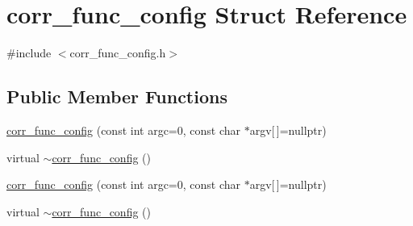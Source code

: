 \hypertarget{structcorr__func__config}{\section{corr\-\_\-func\-\_\-config Struct Reference}
\label{structcorr__func__config}
}


{\ttfamily \#include $<$corr\-\_\-func\-\_\-config.\-h$>$}

\subsection*{Public Member Functions}
\begin{DoxyCompactItemize}
\item 
\hyperlink{structcorr__func__config_a1d1717cef2daadfc19c4483323377d08}{corr\-\_\-func\-\_\-config} (const int argc=0, const char $\ast$argv\mbox{[}$\,$\mbox{]}=nullptr)
\item 
virtual \hyperlink{structcorr__func__config_a8cfc94f47cce05f0d4b30e53c6afd3d3}{$\sim$corr\-\_\-func\-\_\-config} ()
\item 
\hyperlink{structcorr__func__config_a1d1717cef2daadfc19c4483323377d08}{corr\-\_\-func\-\_\-config} (const int argc=0, const char $\ast$argv\mbox{[}$\,$\mbox{]}=nullptr)
\item 
virtual \hyperlink{structcorr__func__config_a8cfc94f47cce05f0d4b30e53c6afd3d3}{$\sim$corr\-\_\-func\-\_\-config} ()
\end{DoxyCompactItemize}
